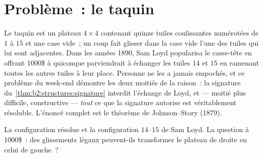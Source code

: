\section{Problème~: le taquin}

Le taquin est un plateau $4 \times 4$ contenant quinze tuiles
coulissantes numérotées de $1$ à $15$ et une case vide~; un coup fait
glisser dans la case vide l'une des tuiles qui lui sont adjacentes.
Dans les années 1890, Sam Loyd popularisa le casse-tête en offrant
1000\$ à quiconque parviendrait à échanger les tuiles $14$ et $15$ en
ramenant toutes les autres tuiles à leur place. Personne ne les a
jamais empochés, et ce problème du week-end démontre les deux moitiés
de la raison~: la signature du~\cref{thm:b2:structures:signature}
interdit l'échange de Loyd, et --- moitié plus difficile,
constructive --- \emph{tout} ce que la signature autorise est
véritablement résoluble. L'énoncé complet est le théorème de
Johnson--Story (1879).

\begin{omfigure}
\qquad
{}

{\small La configuration résolue et la configuration $14$--$15$ de
Sam Loyd. La question à 1000\$~: des glissements légaux peuvent-ils
transformer le plateau de droite en celui de gauche~?}
\end{omfigure}

